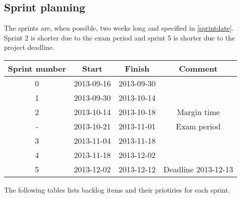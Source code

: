 
\subsection{Sprint planning}

The sprints are, when possible, two weeks long and specified in \ref{sprintdate}. Sprint 2 is shorter due to the exam period and sprint 5 is shorter due to the project deadline.

\label{sprintdate}
\begin{center}
	\begin{Large}
	\begin{tabular}{|c|c|c|c|}
		\hline
		\large{\textbf{Sprint number}} & \large{\textbf{Start}} & \large{\textbf{Finish}} & \large{\textbf{Comment}} \\
		\hline
		\large{0} & \large{2013-09-16} & \large{2013-09-30} & \large{} \\
		\hline
		\large{1} & \large{2013-09-30} & \large{2013-10-14} & \large{} \\
		\hline
		\large{2} & \large{2013-10-14} & \large{2013-10-18} & \large{Margin time} \\
		\hline
		\large{-} & \large{2013-10-21} & \large{2013-11-01} & \large{Exam period} \\
		\hline
		\large{3} & \large{2013-11-04} & \large{2013-11-18} & \large{} \\
		\hline
		\large{4} & \large{2013-11-18} & \large{2013-12-02} & \large{} \\
		\hline	
		\large{5} & \large{2013-12-02} & \large{2013-12-12} & \large{Deadline 2013-12-13} \\
		\hline	
	\end{tabular}
	\end{Large}
\end{center}
\vspace{0.5cm}
The following tables lists backlog items and their priotiries for each sprint. \\

